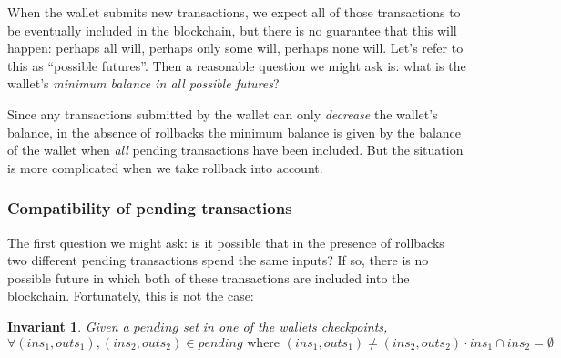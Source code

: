 \documentclass{article}
\newtheorem{invariant}{Invariant}
\begin{document}
When the wallet submits new transactions, we expect all of those transactions
to be eventually included in the blockchain, but there is no guarantee that this
will happen: perhaps all will, perhaps only some will, perhaps none will. Let's
refer to this as ``possible futures''. Then a reasonable question we might ask
is: what is the wallet's \emph{minimum balance in all possible futures}?

Since any transactions submitted by the wallet can only \emph{decrease} the
wallet's balance, in the absence of rollbacks the minimum balance is given
by the balance of the wallet when \emph{all} pending transactions have been
included. But the situation is more complicated when we take rollback into
account.

\subsubsection{Compatibility of pending transactions}

The first question we might ask: is it possible that in the presence of
rollbacks two different pending transactions spend the same inputs? If so, there
is no possible future in which both of these transactions are included into the
blockchain. Fortunately, this is not the case:

\begin{invariant}
Given a $\mathit{pending}$ set in one of the wallets checkpoints,
\begin{equation*}
\forall (\mathit{ins}_1, \mathit{outs}_1), (\mathit{ins}_2, \mathit{outs}_2) \in \mathit{pending} \text{ where } (\mathit{ins}_1, \mathit{outs}_1) \ne (\mathit{ins}_2, \mathit{outs}_2) \cdot
\mathit{ins}_1 \cap \mathit{ins}_2 = \emptyset
\end{equation*}
\end{invariant}
\end{document}
